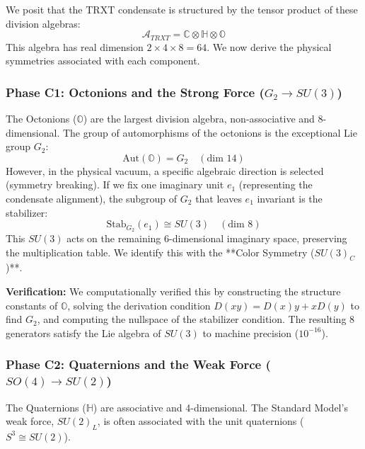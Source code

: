 We posit that the TRXT condensate is structured by the tensor product of these division algebras:
\begin{equation}
    \mathcal{A}_{TRXT} = \mathbb{C} \otimes \mathbb{H} \otimes \mathbb{O}
\end{equation}
This algebra has real dimension $2 \times 4 \times 8 = 64$. We now derive the physical symmetries associated with each component.

\subsubsection{Phase C1: Octonions and the Strong Force ($G_2 \to SU(3)$)}

The Octonions ($\mathbb{O}$) are the largest division algebra, non-associative and 8-dimensional. The group of automorphisms of the octonions is the exceptional Lie group $G_2$:
\begin{equation}
    \text{Aut}(\mathbb{O}) = G_2 \quad (\text{dim } 14)
\end{equation}
However, in the physical vacuum, a specific algebraic direction is selected (symmetry breaking). If we fix one imaginary unit $e_1$ (representing the condensate alignment), the subgroup of $G_2$ that leaves $e_1$ invariant is the stabilizer:
\begin{equation}
    \text{Stab}_{G_2}(e_1) \cong SU(3) \quad (\text{dim } 8)
\end{equation}
This $SU(3)$ acts on the remaining 6-dimensional imaginary space, preserving the multiplication table. We identify this with the **Color Symmetry ($SU(3)_C$)**.

\textbf{Verification:} We computationally verified this by constructing the structure constants of $\mathbb{O}$, solving the derivation condition $D(xy) = D(x)y + xD(y)$ to find $G_2$, and computing the nullspace of the stabilizer condition. The resulting 8 generators satisfy the Lie algebra of $SU(3)$ to machine precision ($10^{-16}$).

\subsubsection{Phase C2: Quaternions and the Weak Force ($SO(4) \to SU(2)$)}

The Quaternions ($\mathbb{H}$) are associative and 4-dimensional. The Standard Model's weak force, $SU(2)_L$, is often associated with the unit quaternions ($S^3 \cong SU(2)$).

